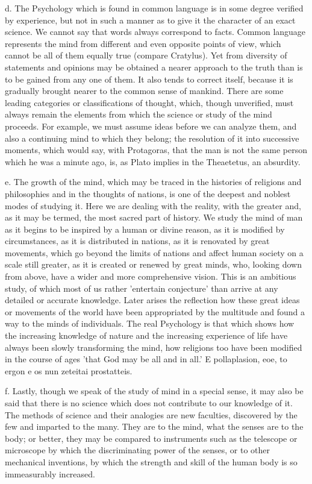 \documentclass[11pt,letter]{article}
\begin{document}
\par  d. The Psychology which is found in common language is in some degree verified by experience, but not in such a manner as to give it the character of an exact science. We cannot say that words always correspond to facts. Common language represents the mind from different and even opposite points of view, which cannot be all of them equally true (compare Cratylus). Yet from diversity of statements and opinions may be obtained a nearer approach to the truth than is to be gained from any one of them. It also tends to correct itself, because it is gradually brought nearer to the common sense of mankind. There are some leading categories or classifications of thought, which, though unverified, must always remain the elements from which the science or study of the mind proceeds. For example, we must assume ideas before we can analyze them, and also a continuing mind to which they belong; the resolution of it into successive moments, which would say, with Protagoras, that the man is not the same person which he was a minute ago, is, as Plato implies in the Theaetetus, an absurdity.

\par  e. The growth of the mind, which may be traced in the histories of religions and philosophies and in the thoughts of nations, is one of the deepest and noblest modes of studying it. Here we are dealing with the reality, with the greater and, as it may be termed, the most sacred part of history. We study the mind of man as it begins to be inspired by a human or divine reason, as it is modified by circumstances, as it is distributed in nations, as it is renovated by great movements, which go beyond the limits of nations and affect human society on a scale still greater, as it is created or renewed by great minds, who, looking down from above, have a wider and more comprehensive vision. This is an ambitious study, of which most of us rather 'entertain conjecture' than arrive at any detailed or accurate knowledge. Later arises the reflection how these great ideas or movements of the world have been appropriated by the multitude and found a way to the minds of individuals. The real Psychology is that which shows how the increasing knowledge of nature and the increasing experience of life have always been slowly transforming the mind, how religions too have been modified in the course of ages 'that God may be all and in all.' E pollaplasion, eoe, to ergon e os nun zeteitai prostatteis.

\par  f. Lastly, though we speak of the study of mind in a special sense, it may also be said that there is no science which does not contribute to our knowledge of it. The methods of science and their analogies are new faculties, discovered by the few and imparted to the many. They are to the mind, what the senses are to the body; or better, they may be compared to instruments such as the telescope or microscope by which the discriminating power of the senses, or to other mechanical inventions, by which the strength and skill of the human body is so immeasurably increased.
\end{document}
